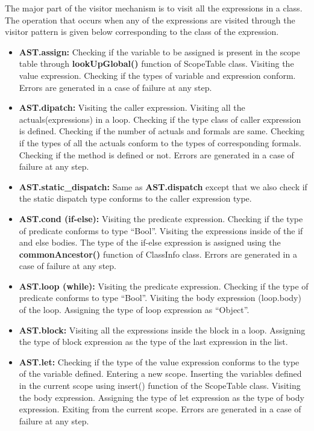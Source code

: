 \documentclass{article}
\begin{document}
The major part of the visitor mechanism is to visit all the expressions in a class. The operation that occurs when any of the expressions are visited through the visitor pattern is given below corresponding to the class of the expression.
\begin{itemize}
    \item \textbf{AST.assign:}  Checking if the variable to be assigned is present in the scope table through \textbf{lookUpGlobal()} function of ScopeTable class. Visiting the value expression. Checking if the types of variable and expression conform. Errors are generated in a case of failure at any step.
    \item \textbf{AST.dipatch:} Visiting the caller expression. Visiting all the actuals(expressions) in a loop. Checking if the type class of caller expression is defined. Checking if the number of actuals and formals are same. Checking if the types of all the actuals conform to the types of corresponding formals. Checking if the method is defined or not. Errors are generated in a case of failure at any step.
    \item \textbf{AST.static\_dispatch:} Same as \textbf{AST.dispatch} except that we also check if the static dispatch type conforms to the caller expression type.
    \item \textbf{AST.cond (if-else):} Visiting the predicate expression. Checking if the type of predicate conforms to type “Bool”. Visiting the expressions inside of the if and else bodies. The type of the if-else expression is assigned using the \textbf{commonAncestor()} function of ClassInfo class. Errors are generated in a case of failure at any step. 
    \item \textbf{AST.loop (while):} Visiting the predicate expression. Checking if the type of predicate conforms to type “Bool”. Visiting the body expression (loop.body) of the loop. Assigning the type of loop expression as “Object”.
    \item \textbf{AST.block:} Visiting all the expressions inside the block in a loop. Assigning the type of block expression as the type of the last expression in the list.
    \item \textbf{AST.let:} Checking if the type of the value expression conforms to the type of the variable defined. Entering a new scope. Inserting the variables defined in the current scope using insert() function of the ScopeTable class. Visiting the body expression. Assigning the type of let expression as the type of body expression. Exiting from the current scope. Errors are generated in a case of failure at any step.

\end{itemize}
\end{document}
